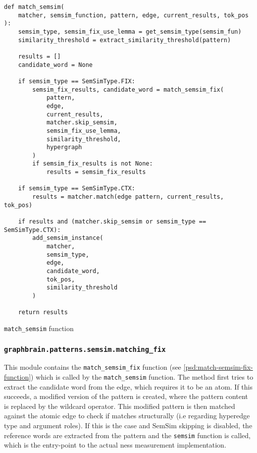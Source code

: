 \documentclass[11pt]{scrreprt}
\begin{document}
\begin{pseudo}
\begin{lstlisting}
def match_semsim(
    matcher, semsim_function, pattern, edge, current_results, tok_pos
):
    semsim_type, semsim_fix_use_lemma = get_semsim_type(semsim_fun)
    similarity_threshold = extract_similarity_threshold(pattern)

    results = []
    candidate_word = None   

    if semsim_type == SemSimType.FIX:
        semsim_fix_results, candidate_word = match_semsim_fix(
            pattern,
            edge,
            current_results,
            matcher.skip_semsim,
            semsim_fix_use_lemma,
            similarity_threshold,
            hypergraph
        )
        if semsim_fix_results is not None:
            results = semsim_fix_results

    if semsim_type == SemSimType.CTX:
        results = matcher.match(edge pattern, current_results, tok_pos)

    if results and (matcher.skip_semsim or semsim_type == SemSimType.CTX):
        add_semsim_instance(
            matcher, 
            semsim_type, 
            edge, 
            candidate_word, 
            tok_pos, 
            similarity_threshold
        )

    return results
\end{lstlisting}
\caption{\texttt{match\_semsim} function}
\label{psd:match-semsim-function}
\end{pseudo}


\subsubsection{\texttt{graphbrain.patterns.semsim.matching\_fix}}
\label{sec:graphbrain.patterns.semsim.matchingfix}
This module contains the \texttt{match\_semsim\_fix} function (see \cref{psd:match-semsim-fix-function}) which is called by the \texttt{match\_semsim} function.
The method first tries to extract the candidate word from the edge, which requires it to be an atom. If this succeeds, a modified version of the pattern is created, where the pattern content is replaced by the wildcard operator. This modified pattern is then matched against the atomic edge to check if matches structurally (i.e regarding hyperedge type and argument roles). If this is the case and SemSim skipping is disabled, the reference words are extracted from the pattern and the \texttt{semsim} function is called, which is the entry-point to the actual \gls{ness} measurement implementation.
\end{document}

